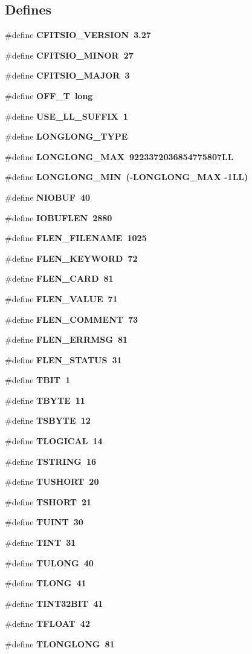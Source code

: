 \subsection*{Defines}
\begin{CompactItemize}
\item 
\#define \bf{CFITSIO\_\-VERSION}~3.27
\item 
\#define \bf{CFITSIO\_\-MINOR}~27
\item 
\#define \bf{CFITSIO\_\-MAJOR}~3
\item 
\#define \bf{OFF\_\-T}~long
\item 
\#define \bf{USE\_\-LL\_\-SUFFIX}~1
\item 
\#define \bf{LONGLONG\_\-TYPE}
\item 
\#define \bf{LONGLONG\_\-MAX}~9223372036854775807LL
\item 
\#define \bf{LONGLONG\_\-MIN}~(-LONGLONG\_\-MAX -1LL)
\item 
\#define \bf{NIOBUF}~40
\item 
\#define \bf{IOBUFLEN}~2880
\item 
\#define \bf{FLEN\_\-FILENAME}~1025
\item 
\#define \bf{FLEN\_\-KEYWORD}~72
\item 
\#define \bf{FLEN\_\-CARD}~81
\item 
\#define \bf{FLEN\_\-VALUE}~71
\item 
\#define \bf{FLEN\_\-COMMENT}~73
\item 
\#define \bf{FLEN\_\-ERRMSG}~81
\item 
\#define \bf{FLEN\_\-STATUS}~31
\item 
\#define \bf{TBIT}~1
\item 
\#define \bf{TBYTE}~11
\item 
\#define \bf{TSBYTE}~12
\item 
\#define \bf{TLOGICAL}~14
\item 
\#define \bf{TSTRING}~16
\item 
\#define \bf{TUSHORT}~20
\item 
\#define \bf{TSHORT}~21
\item 
\#define \bf{TUINT}~30
\item 
\#define \bf{TINT}~31
\item 
\#define \bf{TULONG}~40
\item 
\#define \bf{TLONG}~41
\item 
\#define \bf{TINT32BIT}~41
\item 
\#define \bf{TFLOAT}~42
\item 
\#define \bf{TLONGLONG}~81

\end{CompactItemize}

